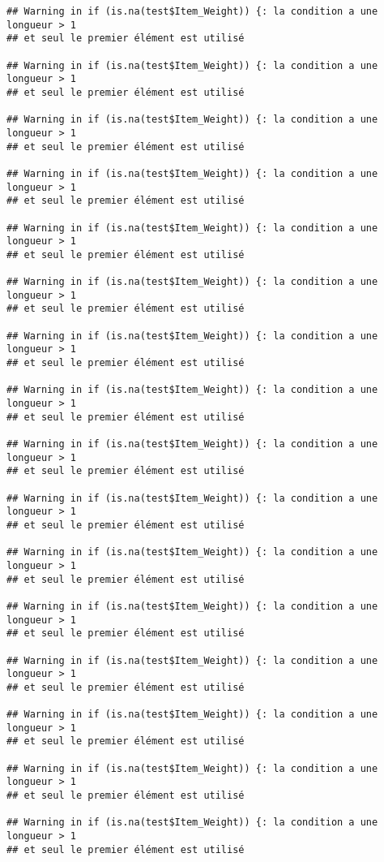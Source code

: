 \documentclass[]{article}
\begin{document}
\begin{verbatim}
## Warning in if (is.na(test$Item_Weight)) {: la condition a une longueur > 1
## et seul le premier élément est utilisé

## Warning in if (is.na(test$Item_Weight)) {: la condition a une longueur > 1
## et seul le premier élément est utilisé

## Warning in if (is.na(test$Item_Weight)) {: la condition a une longueur > 1
## et seul le premier élément est utilisé

## Warning in if (is.na(test$Item_Weight)) {: la condition a une longueur > 1
## et seul le premier élément est utilisé

## Warning in if (is.na(test$Item_Weight)) {: la condition a une longueur > 1
## et seul le premier élément est utilisé

## Warning in if (is.na(test$Item_Weight)) {: la condition a une longueur > 1
## et seul le premier élément est utilisé

## Warning in if (is.na(test$Item_Weight)) {: la condition a une longueur > 1
## et seul le premier élément est utilisé

## Warning in if (is.na(test$Item_Weight)) {: la condition a une longueur > 1
## et seul le premier élément est utilisé

## Warning in if (is.na(test$Item_Weight)) {: la condition a une longueur > 1
## et seul le premier élément est utilisé

## Warning in if (is.na(test$Item_Weight)) {: la condition a une longueur > 1
## et seul le premier élément est utilisé

## Warning in if (is.na(test$Item_Weight)) {: la condition a une longueur > 1
## et seul le premier élément est utilisé

## Warning in if (is.na(test$Item_Weight)) {: la condition a une longueur > 1
## et seul le premier élément est utilisé

## Warning in if (is.na(test$Item_Weight)) {: la condition a une longueur > 1
## et seul le premier élément est utilisé

## Warning in if (is.na(test$Item_Weight)) {: la condition a une longueur > 1
## et seul le premier élément est utilisé

## Warning in if (is.na(test$Item_Weight)) {: la condition a une longueur > 1
## et seul le premier élément est utilisé

## Warning in if (is.na(test$Item_Weight)) {: la condition a une longueur > 1
## et seul le premier élément est utilisé


\end{verbatim}
\end{document}
